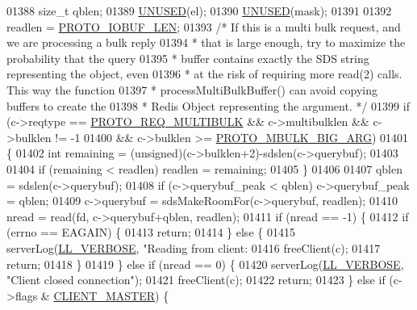 \begin{DoxyCode}
{{{{{{{{{{{{{{{01388     size\_t qblen;
01389     \hyperlink{server_8h_ae7c9dc8f13568a9c856573751f1ee1ec}{UNUSED}(el);
01390     \hyperlink{server_8h_ae7c9dc8f13568a9c856573751f1ee1ec}{UNUSED}(mask);
01391 
01392     readlen = \hyperlink{server_8h_ac30919814359f46fb41e9fc497dd8e05}{PROTO\_IOBUF\_LEN};
01393     \textcolor{comment}{/* If this is a multi bulk request, and we are processing a bulk reply}
01394 \textcolor{comment}{     * that is large enough, try to maximize the probability that the query}
01395 \textcolor{comment}{     * buffer contains exactly the SDS string representing the object, even}
01396 \textcolor{comment}{     * at the risk of requiring more read(2) calls. This way the function}
01397 \textcolor{comment}{     * processMultiBulkBuffer() can avoid copying buffers to create the}
01398 \textcolor{comment}{     * Redis Object representing the argument. */}
01399     \textcolor{keywordflow}{if} (c->reqtype == \hyperlink{server_8h_a50727b40ccd59633a681f9d09a9b9d72}{PROTO\_REQ\_MULTIBULK} && c->multibulklen && c->bulklen != -1
01400         && c->bulklen >= \hyperlink{server_8h_afb6bccf6f1ac66b1d563330ab499fb32}{PROTO\_MBULK\_BIG\_ARG})
01401     \{
01402         \textcolor{keywordtype}{int} remaining = (\textcolor{keywordtype}{unsigned})(c->bulklen+2)-sdslen(c->querybuf);
01403 
01404         \textcolor{keywordflow}{if} (remaining < readlen) readlen = remaining;
01405     \}
01406 
01407     qblen = sdslen(c->querybuf);
01408     \textcolor{keywordflow}{if} (c->querybuf\_peak < qblen) c->querybuf\_peak = qblen;
01409     c->querybuf = sdsMakeRoomFor(c->querybuf, readlen);
01410     nread = read(fd, c->querybuf+qblen, readlen);
01411     \textcolor{keywordflow}{if} (nread == -1) \{
01412         \textcolor{keywordflow}{if} (errno == EAGAIN) \{
01413             \textcolor{keywordflow}{return};
01414         \} \textcolor{keywordflow}{else} \{
01415             serverLog(\hyperlink{server_8h_a479b60032f8da6d8ad72e1a9d0809950}{LL\_VERBOSE}, \textcolor{stringliteral}{"Reading from client: %
01416             freeClient(c);
01417             \textcolor{keywordflow}{return};
01418         \}
01419     \} \textcolor{keywordflow}{else} \textcolor{keywordflow}{if} (nread == 0) \{
01420         serverLog(\hyperlink{server_8h_a479b60032f8da6d8ad72e1a9d0809950}{LL\_VERBOSE}, \textcolor{stringliteral}{"Client closed connection"});
01421         freeClient(c);
01422         \textcolor{keywordflow}{return};
01423     \} \textcolor{keywordflow}{else} \textcolor{keywordflow}{if} (c->flags & \hyperlink{server_8h_a3d8f0cc8d0653ee2b6dafb454292c069}{CLIENT\_MASTER}) \{
}}}}}}}}}}}}}}}}
\end{DoxyCode}
